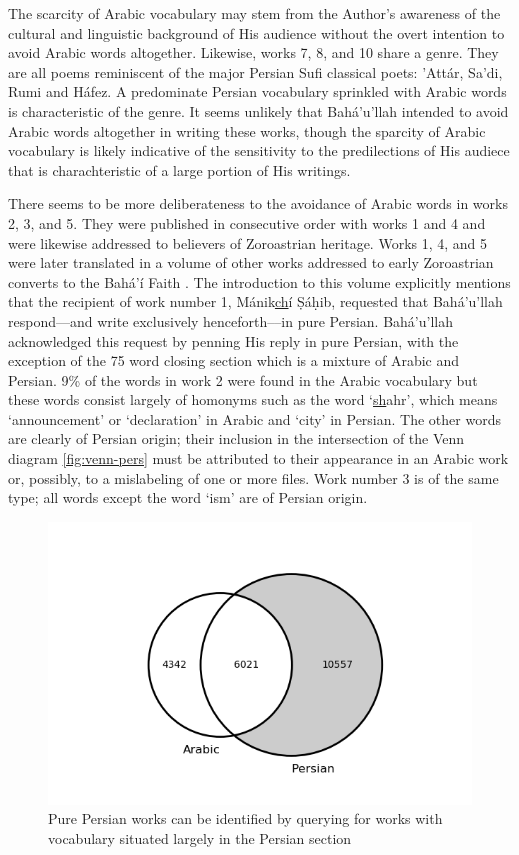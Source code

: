 \documentclass[12pt, oneside]{report}
\begin{document}
The scarcity of Arabic vocabulary may stem from the Author's awareness of the cultural and linguistic background of His audience without the overt intention to avoid Arabic words altogether.
Likewise, works 7, 8, and 10 share a genre.
They are all poems reminiscent of the major Persian Sufi classical poets: 'Att\'{a}r, Sa'di, Rumi and H\'{a}fez.
A predominate Persian vocabulary sprinkled with Arabic words is characteristic of the genre.
It seems unlikely that Bah\'{a}'u'llah intended to avoid Arabic words altogether in writing these works, though the sparcity of Arabic vocabulary is likely indicative of the sensitivity to the predilections of His audiece that is charachteristic of a large portion of His writings.
\par
There seems to be more deliberateness to the avoidance of Arabic words in works 2, 3, and 5.
They were published in consecutive order with works 1 and 4 and were likewise addressed to believers of Zoroastrian heritage.
Works 1, 4, and 5 were later translated in a volume of other works addressed to early Zoroastrian converts to the Bah\'{a}'\'{i} Faith \cite{bahaullah_tabernacle_2006}.
The introduction to this volume explicitly mentions that the recipient of work number 1, M\'{a}nik\underline{ch}\'{i} Ṣ\'{a}ḥib, requested that Bah\'{a}'u'llah respond--–and write exclusively henceforth–--in pure Persian.
Bah\'{a}'u'llah acknowledged this request by penning His reply in pure Persian, with the exception of the 75 word closing section which is a mixture of Arabic and Persian.
9\% of the words in work 2 were found in the Arabic vocabulary but these words consist largely of homonyms such as the word `\underline{sh}ahr', which means `announcement' or `declaration' in Arabic and `city' in Persian.
The other words are clearly of Persian origin; their inclusion in the intersection of the Venn diagram \autoref{fig:venn-pers} must be attributed to their appearance in an Arabic work or, possibly, to a mislabeling of one or more files.
Work number 3 is of the same type; all words except the word `ism' are of Persian origin.
\begin{figure}
	\includegraphics[width=\linewidth]{figures/venn-persian.png}
	\caption[Venn diagram with Persian section highlighted]{Pure Persian works can be identified by querying for works with vocabulary situated largely in the Persian section}\label{fig:venn-pers}
\end{figure}
\end{document}
